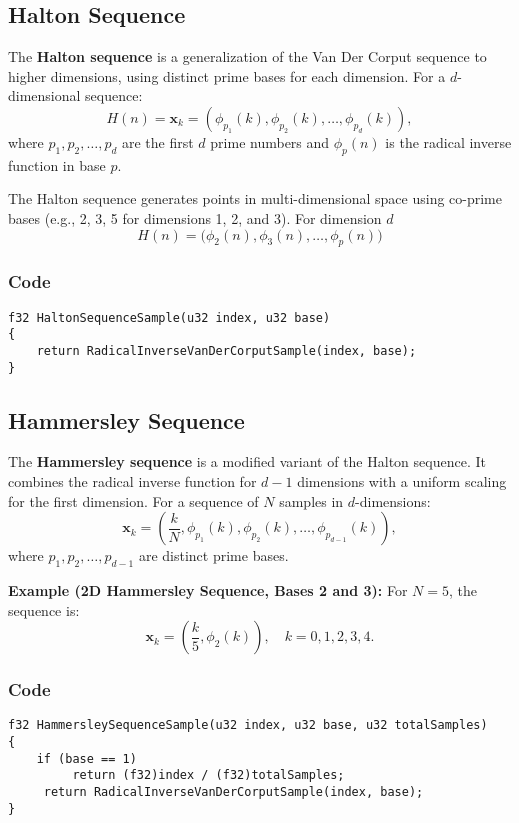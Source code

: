\documentclass{article}
\begin{document}
\subsection{Halton Sequence}
The \textbf{Halton sequence} is a generalization of the Van Der Corput sequence to higher dimensions, using distinct prime bases for each dimension. For a $d$-dimensional sequence:
\[
    H(n) =\mathbf{x}_k = \left( \phi_{p_1}(k), \phi_{p_2}(k), \dots, \phi_{p_d}(k) \right),
\]
where $p_1, p_2, \dots, p_d$ are the first \( d \) prime numbers and $\phi_p(n)$ is the radical inverse function in base $p$.

The Halton sequence generates points in multi-dimensional space using co-prime bases (e.g., 2, 3, 5 for dimensions 1, 2, and 3). For dimension $d$
\[ 
	H(n) = \bigg(\phi_2(n), \phi_3(n), \dots, \phi_p(n) \bigg)
\]

\subsubsection{Code}
\begin{lstlisting}[caption={Halton Sequence}]
f32 HaltonSequenceSample(u32 index, u32 base)
{
	return RadicalInverseVanDerCorputSample(index, base);
} 
\end{lstlisting}

\subsection{Hammersley Sequence}
The \textbf{Hammersley sequence} is a modified variant of the Halton sequence. It combines the radical inverse function for $d-1$ dimensions with a uniform scaling for the first dimension. For a sequence of $N$ samples in $d$-dimensions:
\[
    \mathbf{x}_k = \left(\frac{k}{N}, \phi_{p_1}(k), \phi_{p_2}(k), \dots, \phi_{p_{d-1}}(k) \right),
\]
where \( p_1, p_2, \dots, p_{d-1} \) are distinct prime bases.

\textbf{Example (2D Hammersley Sequence, Bases 2 and 3):}
For \( N = 5 \), the sequence is:
\[
    \mathbf{x}_k = \left(\frac{k}{5}, \phi_2(k) \right), \quad k = 0, 1, 2, 3, 4.
\]

\subsubsection{Code}
\begin{lstlisting}[caption={Hammersley sequence}]
f32 HammersleySequenceSample(u32 index, u32 base, u32 totalSamples)
{
    if (base == 1)
         return (f32)index / (f32)totalSamples;
     return RadicalInverseVanDerCorputSample(index, base);
}
\end{lstlisting}
\end{document}
